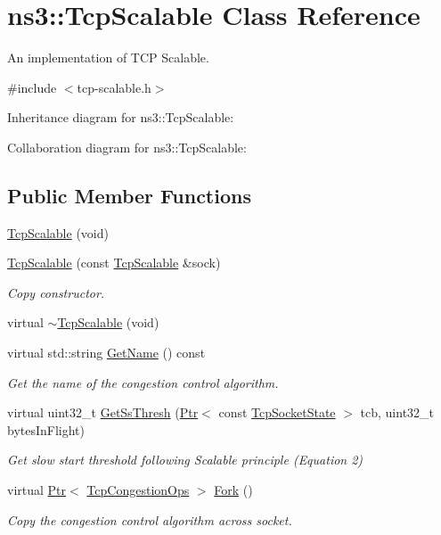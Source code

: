 \hypertarget{classns3_1_1TcpScalable}{}\section{ns3\+:\+:Tcp\+Scalable Class Reference}
\label{classns3_1_1TcpScalable}


An implementation of T\+CP Scalable.  




{\ttfamily \#include $<$tcp-\/scalable.\+h$>$}



Inheritance diagram for ns3\+:\+:Tcp\+Scalable\+:


Collaboration diagram for ns3\+:\+:Tcp\+Scalable\+:
\subsection*{Public Member Functions}
\begin{DoxyCompactItemize}
\item 
\hyperlink{classns3_1_1TcpScalable_a619561b4fc0be650d9d5562f1df7c918}{Tcp\+Scalable} (void)
\item 
\hyperlink{classns3_1_1TcpScalable_a40ba49aebb854ffd698718f945513b6c}{Tcp\+Scalable} (const \hyperlink{classns3_1_1TcpScalable}{Tcp\+Scalable} \&sock)
\begin{DoxyCompactList}\small\item\em Copy constructor. \end{DoxyCompactList}\item 
virtual \hyperlink{classns3_1_1TcpScalable_ad0ecd62b585b96a1ff65a9bc79c10f9a}{$\sim$\+Tcp\+Scalable} (void)
\item 
virtual std\+::string \hyperlink{classns3_1_1TcpScalable_a9284076eee672a0448d83ec0317d8c88}{Get\+Name} () const 
\begin{DoxyCompactList}\small\item\em Get the name of the congestion control algorithm. \end{DoxyCompactList}\item 
virtual uint32\+\_\+t \hyperlink{classns3_1_1TcpScalable_afc28d1793481db0978085efc5b2c243e}{Get\+Ss\+Thresh} (\hyperlink{classns3_1_1Ptr}{Ptr}$<$ const \hyperlink{classns3_1_1TcpSocketState}{Tcp\+Socket\+State} $>$ tcb, uint32\+\_\+t bytes\+In\+Flight)
\begin{DoxyCompactList}\small\item\em Get slow start threshold following Scalable principle (Equation 2) \end{DoxyCompactList}\item 
virtual \hyperlink{classns3_1_1Ptr}{Ptr}$<$ \hyperlink{classns3_1_1TcpCongestionOps}{Tcp\+Congestion\+Ops} $>$ \hyperlink{classns3_1_1TcpScalable_a492457204d44b5cd3089aa913c78c1d2}{Fork} ()
\begin{DoxyCompactList}\small\item\em Copy the congestion control algorithm across socket. \end{DoxyCompactList}\end{DoxyCompactItemize}
